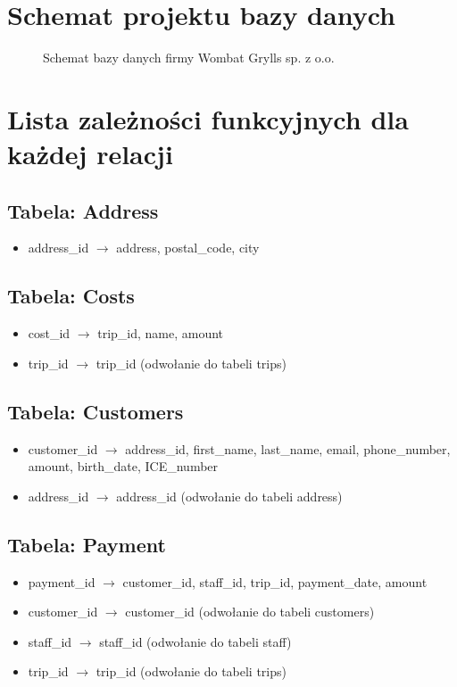 \documentclass{article}
\begin{document}
\section{Schemat projektu bazy danych}
\begin{figure}[h!]
\centering
\caption{Schemat bazy danych firmy Wombat Grylls sp. z o.o.}
\end{figure}

\newpage

\section{Lista zależności funkcyjnych dla każdej relacji}

\subsection{Tabela: Address}
\begin{itemize}
    \item address\_id $\rightarrow$ address, postal\_code, city
\end{itemize}
\subsection{Tabela: Costs}
\begin{itemize}
    \item cost\_id $\rightarrow$ trip\_id, name, amount
    \item trip\_id $\rightarrow$ trip\_id (odwołanie do tabeli trips)
\end{itemize}
\subsection{Tabela: Customers}
\begin{itemize}
    \item customer\_id $\rightarrow$ address\_id, first\_name, last\_name, email, phone\_number, amount, birth\_date, ICE\_number
    \item address\_id $\rightarrow$ address\_id (odwołanie do tabeli address)
\end{itemize}
\subsection{Tabela: Payment}
\begin{itemize}
    \item payment\_id $\rightarrow$ customer\_id, staff\_id, trip\_id, payment\_date, amount
    \item customer\_id $\rightarrow$ customer\_id (odwołanie do tabeli customers)
    \item staff\_id $\rightarrow$ staff\_id (odwołanie do tabeli staff)
    \item trip\_id $\rightarrow$ trip\_id (odwołanie do tabeli trips)
\end{itemize}
\end{document}
